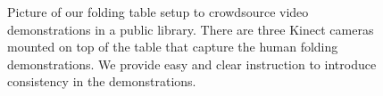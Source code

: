 \documentclass[\home/main.tex]{subfiles}
\begin{document}
\begin{figure}[htb!]
    \centering

    \caption{Picture of our folding table setup to crowdsource video demonstrations in a public library. There are three Kinect cameras mounted on top of the table that capture the human folding demonstrations. We provide easy and clear instruction to introduce consistency in the demonstrations.}
    \label{fig:douglas}
\end{figure}
\end{document}
